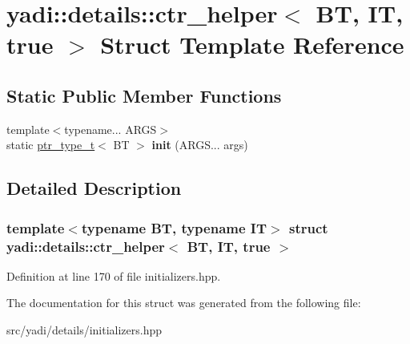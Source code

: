 \hypertarget{structyadi_1_1details_1_1ctr__helper_3_01_b_t_00_01_i_t_00_01true_01_4}{}\section{yadi\+:\+:details\+:\+:ctr\+\_\+helper$<$ BT, IT, true $>$ Struct Template Reference}
\label{structyadi_1_1details_1_1ctr__helper_3_01_b_t_00_01_i_t_00_01true_01_4}
\subsection*{Static Public Member Functions}
\begin{DoxyCompactItemize}
\item 
\mbox{\label{structyadi_1_1details_1_1ctr__helper_3_01_b_t_00_01_i_t_00_01true_01_4_a3c5dce230474dd7c1299bee33f9745af}} 
{\footnotesize template$<$typename... A\+R\+GS$>$ }\\static \hyperlink{namespaceyadi_a92290eb27cd90666aa87b17d854af9fe}{ptr\+\_\+type\+\_\+t}$<$ BT $>$ {\bfseries init} (A\+R\+G\+S... args)
\end{DoxyCompactItemize}


\subsection{Detailed Description}
\subsubsection*{template$<$typename BT, typename IT$>$\newline
struct yadi\+::details\+::ctr\+\_\+helper$<$ B\+T, I\+T, true $>$}



Definition at line 170 of file initializers.\+hpp.



The documentation for this struct was generated from the following file\+:\begin{DoxyCompactItemize}
\item 
src/yadi/details/initializers.\+hpp\end{DoxyCompactItemize}
